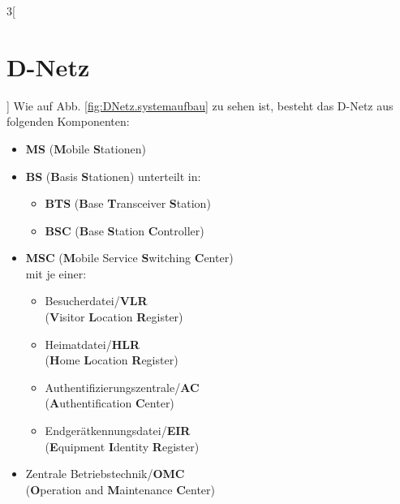 \begin{multicols}{3}[\section{D-Netz}]
Wie auf Abb. \ref{fig:DNetz.systemaufbau} zu sehen ist, besteht das D-Netz aus folgenden Komponenten: 

\begin{itemize}
	\item \textbf{MS} (\textbf{M}obile \textbf{S}tationen)
	\item \textbf{BS} (\textbf{B}asis \textbf{S}tationen) unterteilt in:
		\begin{itemize}
			\item \textbf{BTS} (\textbf{B}ase \textbf{T}ransceiver \textbf{S}tation)
			\item \textbf{BSC} (\textbf{B}ase \textbf{S}tation \textbf{C}ontroller)
		\end{itemize}
	\item \textbf{MSC} (\textbf{M}obile Service \textbf{S}witching \textbf{C}enter) \\ mit je einer: 
		\begin{itemize}
			\item Besucherdatei/\textbf{VLR} \\ (\textbf{V}isitor \textbf{L}ocation \textbf{R}egister)
			\item Heimatdatei/\textbf{HLR} \\ (\textbf{H}ome \textbf{L}ocation \textbf{R}egister)
			\item Authentifizierungszentrale/\textbf{AC} \\ (\textbf{A}uthentification \textbf{C}enter)
			\item Endgerätkennungsdatei/\textbf{EIR} \\ (\textbf{E}quipment \textbf{I}dentity \textbf{R}egister)
		\end{itemize}
	\item Zentrale Betriebstechnik/\textbf{OMC} \\ (\textbf{O}peration and \textbf{M}aintenance \textbf{C}enter) \\
\end{itemize}



\end{multicols}
